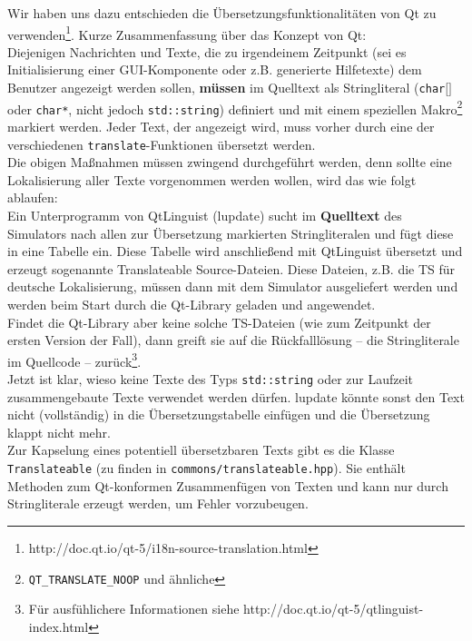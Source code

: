  Wir haben uns dazu entschieden die Übersetzungsfunktionalitäten von Qt zu
 verwenden\footnote{http://doc.qt.io/qt-5/i18n-source-translation.html}. Kurze
 Zusammenfassung über das Konzept von Qt:\\
 Diejenigen Nachrichten und Texte, die zu irgendeinem Zeitpunkt (sei es
 Initialisierung einer GUI-Komponente oder z.B. generierte Hilfetexte) dem
 Benutzer angezeigt werden sollen, \textbf{müssen} im Quelltext als
 Stringliteral (\texttt{char$\lbrack \rbrack$} oder \texttt{char*}, nicht jedoch
 \texttt{std::string}) definiert und mit einem speziellen
 Makro\footnote{\texttt{QT\_TRANSLATE\_NOOP} und ähnliche} markiert werden.
 Jeder Text, der angezeigt wird, muss vorher durch eine der verschiedenen
 \texttt{translate}-Funktionen übersetzt werden.\\

 Die obigen Maßnahmen müssen zwingend durchgeführt werden, denn sollte eine
 Lokalisierung aller Texte vorgenommen werden wollen, wird das wie folgt
 ablaufen:\\

 Ein Unterprogramm von QtLinguist (lupdate) sucht im \textbf{Quelltext} des
 Simulators nach allen zur Übersetzung markierten Stringliteralen und fügt diese
 in eine Tabelle ein. Diese Tabelle wird anschließend mit QtLinguist übersetzt
 und erzeugt sogenannte Translateable Source-Dateien. Diese Dateien, z.B. die TS
 für deutsche Lokalisierung, müssen dann mit dem Simulator ausgeliefert werden
 und werden beim Start durch die Qt-Library geladen und angewendet.\\

 Findet die Qt-Library aber keine solche TS-Dateien (wie zum Zeitpunkt der
 ersten Version der Fall), dann greift sie auf die Rückfalllösung -- die
 Stringliterale im Quellcode -- zurück\footnote{Für ausfühlichere Informationen
 siehe http://doc.qt.io/qt-5/qtlinguist-index.html}.\\

 Jetzt ist klar, wieso keine Texte des Typs \texttt{std::string} oder zur
 Laufzeit zusammengebaute Texte verwendet werden dürfen. lupdate könnte sonst
 den Text nicht (vollständig) in die Übersetzungstabelle einfügen und die
 Übersetzung klappt nicht mehr.\\

 Zur Kapselung eines potentiell übersetzbaren Texts gibt es die Klasse
 \texttt{Translateable} (zu finden in \texttt{commons/translateable.hpp}). Sie
 enthält Methoden zum Qt-konformen Zusammenfügen von Texten und kann nur durch
 Stringliterale erzeugt werden, um Fehler vorzubeugen.
